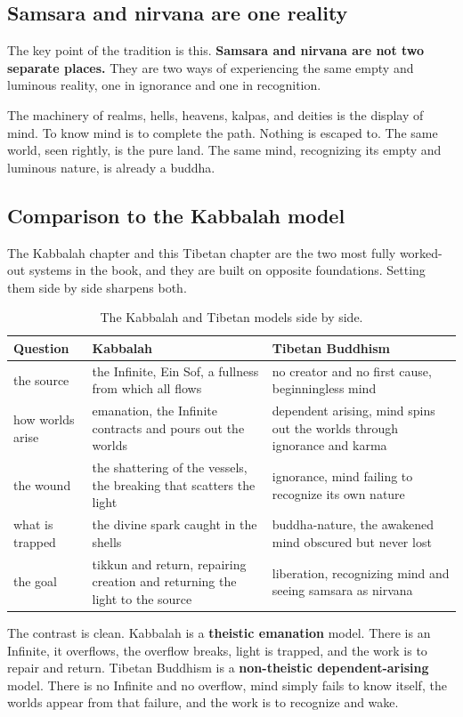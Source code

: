 \subsection{Samsara and nirvana are one reality}

The key point of the tradition is this. \textbf{Samsara and nirvana are not two separate places.} They are two ways of experiencing the same empty and luminous reality, one in ignorance and one in recognition.

The machinery of realms, hells, heavens, kalpas, and deities is the display of mind. To know mind is to complete the path. Nothing is escaped to. The same world, seen rightly, is the pure land. The same mind, recognizing its empty and luminous nature, is already a buddha.

\subsection{Comparison to the Kabbalah model}

The Kabbalah chapter and this Tibetan chapter are the two most fully worked-out systems in the book, and they are built on opposite foundations. Setting them side by side sharpens both.

\begin{longtable}{L{3.0cm} L{4.2cm} L{4.2cm}}
\caption{The Kabbalah and Tibetan models side by side.}\\
\toprule
\textbf{Question} & \textbf{Kabbalah} & \textbf{Tibetan Buddhism} \\
\midrule
the source & the Infinite, Ein Sof, a fullness from which all flows & no creator and no first cause, beginningless mind \\
how worlds arise & emanation, the Infinite contracts and pours out the worlds & dependent arising, mind spins out the worlds through ignorance and karma \\
the wound & the shattering of the vessels, the breaking that scatters the light & ignorance, mind failing to recognize its own nature \\
what is trapped & the divine spark caught in the shells & buddha-nature, the awakened mind obscured but never lost \\
the goal & tikkun and return, repairing creation and returning the light to the source & liberation, recognizing mind and seeing samsara as nirvana \\
\bottomrule
\end{longtable}

The contrast is clean. Kabbalah is a \textbf{theistic emanation} model. There is an Infinite, it overflows, the overflow breaks, light is trapped, and the work is to repair and return. Tibetan Buddhism is a \textbf{non-theistic dependent-arising} model. There is no Infinite and no overflow, mind simply fails to know itself, the worlds appear from that failure, and the work is to recognize and wake.

